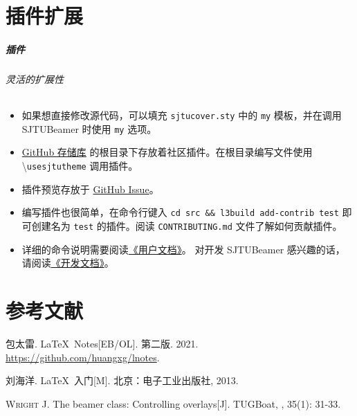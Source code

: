 \documentclass[
    aspectratio=169,  %
]{ctexbeamer}
\begin{document}
\part{插件扩展}

\begin{frame}
  \frametitle{插件}
  \framesubtitle{灵活的扩展性}

  \begin{itemize}
    \item 如果想直接修改源代码，可以填充 \texttt{sjtucover.sty} 中的 \texttt{my}
          模板，并在调用 SJTUBeamer 时使用 \texttt{my} 选项。
    \item \href{https://github.com/sjtug/SJTUBeamer}{GitHub 存储库}
          的根目录下存放着社区插件。在根目录编写文件使用 \textbackslash\texttt{usesjtutheme} 调用插件。
    \item 插件预览存放于
          \href{https://github.com/sjtug/SJTUBeamer/issues/81}{GitHub Issue}。
    \item 编写插件也很简单，在命令行键入
          \texttt{cd src \&\& l3build add-contrib test}
          即可创建名为 \texttt{test} 的插件。阅读 \texttt{CONTRIBUTING.md}
          文件了解如何贡献插件。
    \item 详细的命令说明需要阅读\href{run:sjutbeamer.pdf}{《用户文档》}。
          对开发 SJTUBeamer 感兴趣的话，请阅读\href{run:sjtubeamerdevguide.pdf}{《开发文档》}。
  \end{itemize}
\end{frame}

\part{参考文献}
\begin{frame}[allowframebreaks]

  \printbibliography[heading=none]
\end{frame}

\begin{frame}
  \begin{bibliolist}{00}
    \onlineitem 包太雷.
    \newblock \LaTeX\ Notes[EB/OL].
    \newblock 第二版. 2021. \url{https://github.com/huangxg/lnotes}.

    \bookitem 刘海洋.
    \newblock \LaTeX\ 入门[M].
    \newblock 北京：电子工业出版社, 2013.

    \articleitem \textsc{Wright J.}
    \newblock The beamer class: Controlling overlays[J].
    \newblock TUGBoat,
    , 35(1): 31-33.
  \end{bibliolist}
\end{frame}

\makebottom
\end{document}
